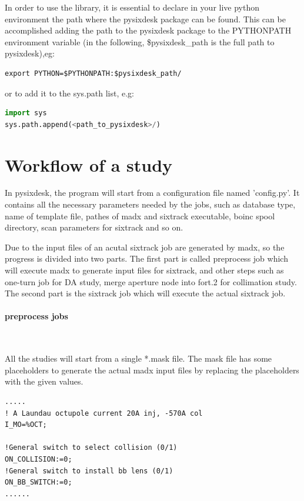 In order to use the library, it is essential to declare in your live python environment the path where the pysixdesk package can be found. This can be accomplished adding the path to the pysixdesk package to the PYTHONPATH environment variable (in the following, \$pysixdesk\_path is the full path to pysixdesk),eg:

\begin{lstlisting}
export PYTHON=$PYTHONPATH:$pysixdesk_path/
\end{lstlisting}

or to add it to the sys.path list, e.g:

\begin{lstlisting}[language=Python]
import sys
sys.path.append(<path_to_pysixdesk>/)
\end{lstlisting}

\section{Workflow of a study}

In pysixdesk, the program will start from a configuration file named 'config.py'. It contains all the necessary parameters needed by the jobs, such as database type, name of template file, pathes of madx and sixtrack executable, boinc spool directory, scan parameters for sixtrack and so on.

Due to the input files of an acutal sixtrack job are generated by madx, so the progress is divided into two parts. The first part is called preprocess job which will execute madx to generate input files for sixtrack, and other steps such as one-turn job for DA study, merge aperture node into fort.2 for collimation study. The second part is the sixtrack job which will execute the actual sixtrack job. 
\paragraph{preprocess jobs}~

All the studies will start from a single *.mask file. The mask file has some placeholders to generate the actual madx input files by replacing the placeholders with the given values.
\begin{lstlisting}
.....
! A Laundau octupole current 20A inj, -570A col
I_MO=%OCT;

!General switch to select collision (0/1)
ON_COLLISION:=0;
!General switch to install bb lens (0/1)
ON_BB_SWITCH:=0;
......
\end{lstlisting}

